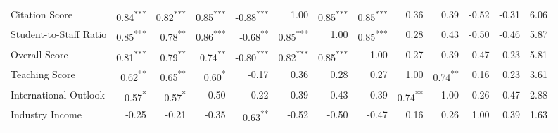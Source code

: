 \documentclass[conference]{IEEEtran}
\begin{document}
\begin{table*}[h!]
\begin{tabular}{|l|r|r|r|r|r|r|r|r|r|r|r|r|}
	Citation Score & \cellcolor{gray!42}0.84\textsuperscript{***} & \cellcolor{gray!41}0.82\textsuperscript{***} & \cellcolor{gray!44}0.85\textsuperscript{***} & \cellcolor{gray!50}-0.88\textsuperscript{***} & \cellcolor{gray!50}1.00 & \cellcolor{gray!44}0.85\textsuperscript{***} & \cellcolor{gray!44}0.85\textsuperscript{***} & \cellcolor{gray!09}0.36 & \cellcolor{gray!19}0.39 & \cellcolor{gray!20}-0.52 & \cellcolor{gray!15}-0.31 & 6.06 \\
	
	Student-to-Staff Ratio & \cellcolor{gray!42}0.85\textsuperscript{***} & \cellcolor{gray!39}0.78\textsuperscript{**} & \cellcolor{gray!43}0.86\textsuperscript{***} & \cellcolor{gray!22}-0.68\textsuperscript{**} & \cellcolor{gray!44}0.85\textsuperscript{***} & \cellcolor{gray!50}1.00 & \cellcolor{gray!42}0.85\textsuperscript{***} & \cellcolor{gray!11}0.28 & \cellcolor{gray!21}0.43 & \cellcolor{gray!20}-0.50 & \cellcolor{gray!18}-0.46 & 5.87 \\
	
	Overall Score & \cellcolor{gray!40}0.81\textsuperscript{***} & \cellcolor{gray!39}0.79\textsuperscript{**} & \cellcolor{gray!37}0.74\textsuperscript{**} & \cellcolor{gray!40}-0.80\textsuperscript{***} & \cellcolor{gray!41}0.82\textsuperscript{***} & \cellcolor{gray!42}0.85\textsuperscript{***} & \cellcolor{gray!50}1.00 & \cellcolor{gray!13}0.27 & \cellcolor{gray!19}0.39 & \cellcolor{gray!23}-0.47 & \cellcolor{gray!11}-0.23 & 5.81 \\
	
	Teaching Score & \cellcolor{gray!31}0.62\textsuperscript{**} & \cellcolor{gray!32}0.65\textsuperscript{**} & \cellcolor{gray!30}0.60\textsuperscript{*} & \cellcolor{gray!8}-0.17 & \cellcolor{gray!18}0.36 & \cellcolor{gray!14}0.28 & \cellcolor{gray!13}0.27 & \cellcolor{gray!50}1.00 & \cellcolor{gray!37}0.74\textsuperscript{**} & \cellcolor{gray!8}0.16 & \cellcolor{gray!11}0.23 & 3.61 \\
	
	International Outlook & \cellcolor{gray!28}0.57\textsuperscript{*} & \cellcolor{gray!28}0.57\textsuperscript{*} & \cellcolor{gray!25}0.50 & \cellcolor{gray!11}-0.22 & \cellcolor{gray!19}0.39 & \cellcolor{gray!21}0.43 & \cellcolor{gray!19}0.39 & \cellcolor{gray!37}0.74\textsuperscript{**} & \cellcolor{gray!50}1.00 & \cellcolor{gray!13}0.26 & \cellcolor{gray!23}0.47 & 2.88 \\
	
	Industry Income & \cellcolor{gray!12}-0.25 & \cellcolor{gray!10}-0.21 & \cellcolor{gray!17}-0.35 & \cellcolor{gray!31}0.63\textsuperscript{**} & \cellcolor{gray!20}-0.52 & \cellcolor{gray!25}-0.50 & \cellcolor{gray!23}-0.47 & \cellcolor{gray!8}0.16 & \cellcolor{gray!13}0.26 & \cellcolor{gray!50}1.00 & \cellcolor{gray!19}0.39 & 1.63 \\
	

\end{tabular}
\end{table*}
\end{document}
